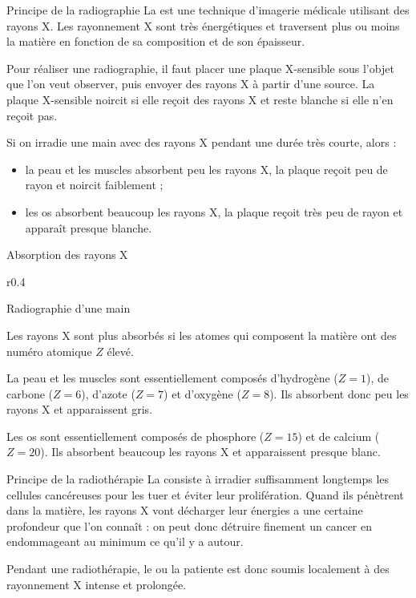 \begin{doc}{Principe de la radiographie}
  La  est une technique d'imagerie médicale utilisant des rayons X.
  Les rayonnement X sont très énergétiques et traversent plus ou moins la matière en fonction de sa composition et de son épaisseur.

  Pour réaliser une radiographie, il faut placer une plaque X-sensible sous l'objet que l'on veut observer, puis envoyer des rayons X à partir d'une source.
  La plaque X-sensible noircit si elle reçoit des rayons X et reste blanche si elle n'en reçoit pas.

  Si on irradie une main avec des rayons X pendant une durée très courte, alors :
  \begin{itemize}
    \item la peau et les muscles absorbent peu les rayons X, la plaque reçoit peu de rayon et noircit faiblement ;
    \item les os absorbent beaucoup les rayons X, la plaque reçoit très peu de rayon et apparaît presque blanche.
  \end{itemize}
\end{doc}

\begin{doc}{Absorption des rayons X}
  \begin{wrapfigure}{r}{0.4\linewidth}
    \vspace*{-34pt}

    \centering Radiographie d'une main    
  \end{wrapfigure}
  
  Les rayons X sont plus absorbés si les atomes qui composent la matière ont des numéro atomique $Z$ élevé.
  \begin{listePoints}
    \item La peau et les muscles sont essentiellement composés d'hydrogène ($Z = 1$), de carbone ($Z = 6$), d'azote ($Z = 7$) et d'oxygène  ($Z = 8$).
    Ils absorbent donc peu les rayons X et apparaissent gris.
    \item Les os sont essentiellement composés de phosphore ($Z = 15$) et de calcium ($Z = 20$).
    Ils absorbent beaucoup les rayons X et apparaissent presque blanc.
  \end{listePoints}
\end{doc}

\begin{doc}{Principe de la radiothérapie}
  La  consiste à irradier suffisamment longtemps les cellules cancéreuses pour les tuer et éviter leur prolifération.
  Quand ils pénètrent dans la matière, les rayons X vont décharger leur énergies a une certaine profondeur que l'on connaît : on peut donc détruire finement un cancer en endommageant au minimum ce qu'il y a autour.

  Pendant une radiothérapie, le ou la patiente est donc soumis localement à des rayonnement X intense et prolongée.
\end{doc}


